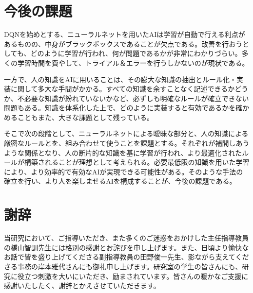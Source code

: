 \documentclass[12pt]{jreport}
\begin{document}
\section{今後の課題}
DQNを始めとする、ニューラルネットを用いたAIは学習が自動で行える利点があるものの、中身がブラックボックスであることが欠点である。改善を行おうとしても、どのように学習が行われ、何が問題であるかが非常にわかりづらい。多くの学習時間を費やして、トライアル＆エラーを行うしかないのが現状である。

一方で、人の知識をAIに用いることは、その膨大な知識の抽出とルール化・実装に関して多大な手間がかかる。すべての知識を余すことなく記述できるかどうか、不必要な知識が紛れていないかなど、必ずしも明確なルールが確立できない問題もある。知識を体系化した上で、どのように実装すると有効であるかを確かめることもまた、大きな課題として残っている。

そこで次の段階として、ニューラルネットによる曖昧な部分と、人の知識による厳密なルールとを、組み合わせて使うことを課題とする。それぞれが補間しあうような関係となり、人の断片的な知識を基に学習が行われ、より最適化されたルールが構築されることが理想として考えられる。必要最低限の知識を用いた学習により、より効率的で有効なAIが実現できる可能性がある。そのような手法の確立を行い、より人を楽しませるAIを構成することが、今後の課題である。

\clearpage



\section*{謝辞}
当研究において、ご指導いただき、また多くのご迷惑をおかけした主任指導教員の橋山智訓先生には格別の感謝とお詫びを申し上げます。また、日頃より愉快なお話で皆を盛り上げてくださる副指導教員の田野俊一先生、影ながら支えてくださる事務の岸本雅代さんにも御礼申し上げます。研究室の学生の皆さんにも、研究に役立つ刺激を大いにいただき、励まされています。皆さんの暖かなご支援に感謝いたしたく、謝辞とかえさせていただきます。
\end{document}
